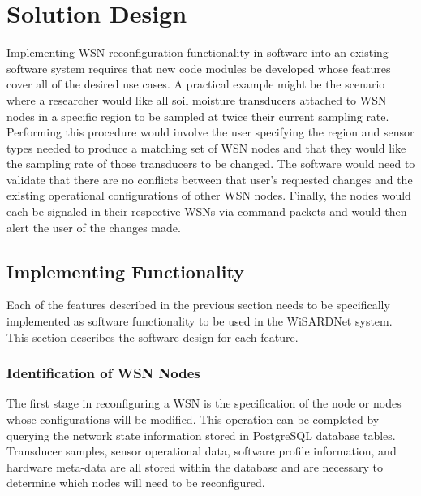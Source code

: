 \section{Solution Design}
Implementing WSN reconfiguration functionality in software into an existing software system requires that new code modules be developed whose features cover all of the desired use cases. A practical example might be the scenario where a researcher would like all soil moisture transducers attached to WSN nodes in a specific region to be sampled at twice their current sampling rate. Performing this procedure would involve the user specifying the region and sensor types needed to produce a matching set of WSN nodes and that they would like the sampling rate of those transducers to be changed. The software would need to validate that there are no conflicts between that user's requested changes and the existing operational configurations of other WSN nodes. Finally, the nodes would each be signaled in their respective WSNs via command packets and would then alert the user of the changes made.

\subsection{Implementing Functionality}
Each of the features described in the previous section needs to be specifically implemented as software functionality to be used in the WiSARDNet system. This section describes the software design for each feature. 

\subsubsection{Identification of WSN Nodes}
The first stage in reconfiguring a WSN is the specification of the node or nodes whose configurations will be modified. This operation can be completed by querying the network state information stored in PostgreSQL database tables. Transducer samples, sensor operational data, software profile information, and hardware meta-data are all stored within the database and are necessary to determine which nodes will need to be reconfigured. 

